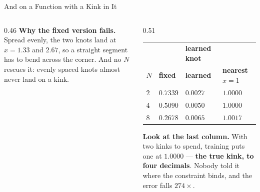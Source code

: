 \begin{frame}{And on a Function with a Kink in It}
\begin{columns}[T]
\begin{column}{0.46\textwidth}
{\footnotesize \textbf{Why the fixed version fails.} Spread evenly, the two knots land at $x=1.33$ and $2.67$, so a straight segment has to bend across the corner. And no $N$ rescues it: evenly spaced knots almost never land on a kink.}
\end{column}
\begin{column}{0.51\textwidth}
\begin{center}\footnotesize
\begin{tabularx}{\linewidth}{@{}>{\raggedleft\arraybackslash}p{0.5cm} >{\raggedleft\arraybackslash}X >{\raggedleft\arraybackslash}X >{\raggedleft\arraybackslash}p{1.7cm}@{}}
\toprule
 & \multicolumn{2}{c}{$\max|\text{err}|$, knots} & \textbf{learned knot} \\
$N$ & \textbf{fixed} & \textbf{learned} & \textbf{nearest $x=1$} \\
\midrule
$2$ & $0.7339$ & $\mathbf{0.0027}$ & $1.0000$ \\
$4$ & $0.5090$ & $\mathbf{0.0050}$ & $1.0000$ \\
$8$ & $0.2678$ & $\mathbf{0.0065}$ & $1.0017$ \\
\bottomrule
\end{tabularx}
\end{center}
\smallskip
\begin{takeawaybox}\footnotesize
\textbf{Look at the last column.} With two kinks to spend, training puts one at $1.0000$ --- \textbf{the true kink, to four decimals}. Nobody told it where the constraint binds, and the error falls \textbf{$274\times$}.
\end{takeawaybox}
\end{column}
\end{columns}
\vspace{1mm}
\end{frame}

